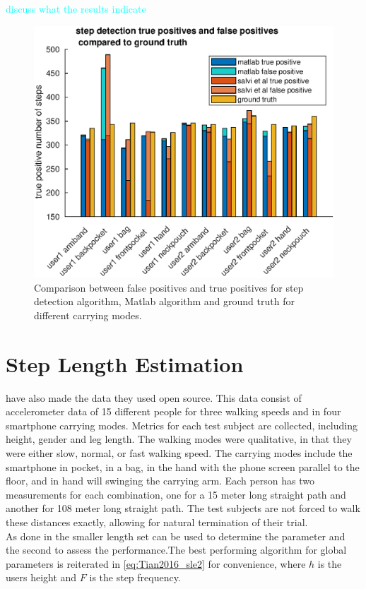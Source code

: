 \textcolor{cyan}{discuss what the results indicate}

\begin{figure}
	\centering
	\includegraphics[width=0.7\linewidth]{images/20200930_1510_tp_fp_abs_comparison}
\caption[False positives and true positives step detection comparison]{Comparison between false positives and true positives for \citet{Salvi2018} step detection algorithm, Matlab algorithm and ground truth for different carrying modes.}
\label{fig:sd_tp_fp_comparison}
\end{figure}

\newpage

\section{Step Length Estimation}

\citet{Vezocnik2019} have also made the data they used open source. This data consist of accelerometer data of 15 different people for three walking speeds and in four smartphone carrying modes. Metrics for each test subject are collected, including height, gender and leg length. The walking modes were qualitative, in that they were either slow, normal, or fast walking speed. The carrying modes include the smartphone in pocket, in a bag, in the hand with the phone screen parallel to the floor, and in hand will swinging the carrying arm. Each person has two measurements for each combination, one for a 15 meter long straight path and another for 108 meter long straight path. The test subjects are not forced to walk these distances exactly, allowing for natural termination of their trial. \\
As done in \cite{Vezocnik2019} the smaller length set can be used to determine the parameter and the second to assess the performance.The best performing algorithm for global parameters is reiterated in \eqref{eq:Tian2016_sle2} for convenience, where $h$ is the users height and $F$ is the step frequency. 

